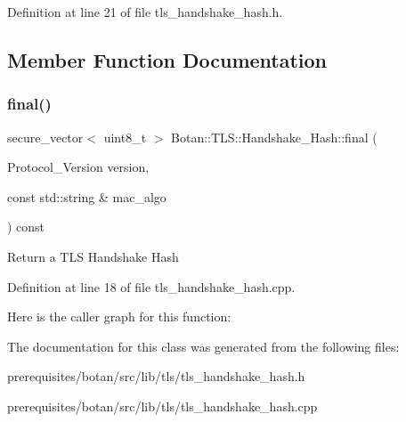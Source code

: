 Definition at line 21 of file tls\+\_\+handshake\+\_\+hash.\+h.



\subsection{Member Function Documentation}
\mbox{\label{class_botan_1_1_t_l_s_1_1_handshake___hash_aa7bb43268391e1407afce564188c903f}} 
\subsubsection{\texorpdfstring{final()}{final()}}
{\footnotesize\ttfamily secure\+\_\+vector$<$ uint8\+\_\+t $>$ Botan\+::\+T\+L\+S\+::\+Handshake\+\_\+\+Hash\+::final (\begin{DoxyParamCaption}\item[{Protocol\+\_\+\+Version}]{version,  }\item[{const std\+::string \&}]{mac\+\_\+algo }\end{DoxyParamCaption}) const}

Return a T\+LS Handshake Hash 

Definition at line 18 of file tls\+\_\+handshake\+\_\+hash.\+cpp.

Here is the caller graph for this function\+:


The documentation for this class was generated from the following files\+:\begin{DoxyCompactItemize}
\item 
prerequisites/botan/src/lib/tls/tls\+\_\+handshake\+\_\+hash.\+h\item 
prerequisites/botan/src/lib/tls/tls\+\_\+handshake\+\_\+hash.\+cpp\end{DoxyCompactItemize}
